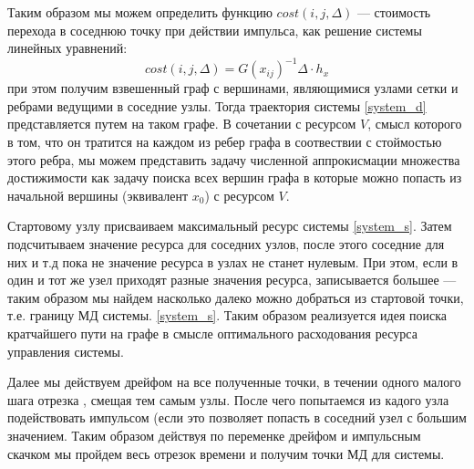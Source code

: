 Таким образом мы можем определить функцию $cost(i,j,\Delta)$ ---
стоимость перехода в соседнюю точку при действии импульса, как решение
системы линейных уравнений:
$$cost(i,j,\Delta) = G(x_{ij})^{-1} \Delta \cdot h_x$$ при этом
получим взвешенный граф с вершинами, являющимися узлами сетки и
ребрами ведущими в соседние узлы. Тогда траектория системы
\eqref{system_d} представляется путем на таком графе. В сочетании с
ресурсом $V$, смысл которого в том, что он тратится на каждом из ребер
графа в соотвествии с стоймостью этого ребра, мы можем представить
задачу численной аппрокисмации множества достижимости как задачу
поиска всех вершин графа в которые можно попасть из начальной вершины
(эквивалент $x_0$) с ресурсом $V$. 

Стартовому узлу присваиваем максимальный ресурс системы \eqref{system_s}. Затем
подсчитываем значение ресурса для соседних узлов, после этого соседние
для них и т.д пока не значение ресурса в узлах не станет нулевым. При
этом, если в один и тот же узел приходят разные значения ресурса,
записывается большее — таким образом мы найдем насколько далеко можно
добраться из стартовой точки, т.е. границу МД системы. \eqref{system_s}. Таким
образом реализуется идея поиска кратчайшего пути на графе в смысле
оптимального расходования ресурса управления системы.

Далее мы действуем дрейфом на все полученные точки, в течении одного
малого шага отрезка , смещая тем самым узлы. После чего попытаемся из
кадого узла подействовать импульсом (если это позволяет попасть в
соседний узел с большим значением.  Таким образом действуя по
переменке дрейфом и импульсным скачком мы пройдем весь отрезок времени
и получим точки МД для системы.



